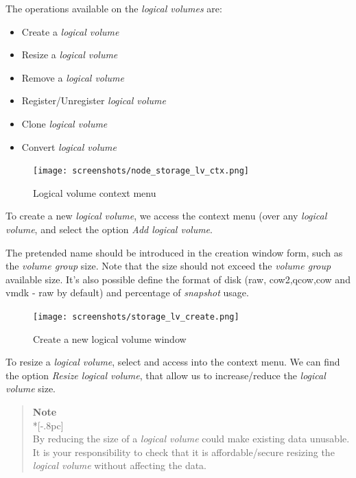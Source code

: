 The operations available on the \emph{logical volumes} are:
\begin{itemize}
	\item Create a \emph{logical volume}
	\item Resize a \emph{logical volume}
	\item Remove a \emph{logical volume}
	\item Register/Unregister \emph{logical volume}
    \item Clone \emph{logical volume}
    \item Convert \emph{logical volume}
\end{itemize}

\begin{figure}[H]
        \begin{center}
        \texttt{[image: screenshots/node\_storage\_lv\_ctx.png]}
        \caption{Logical volume context menu}
        \label{fig:storage_lv_ctx}
        \end{center}
\end{figure}

To create a new \emph{logical volume}, we access the context menu (over any \emph{logical volume}, and select the option \emph{Add logical volume}.

The pretended name should be introduced in the creation window form, such as the \emph{volume group} size. Note that the size should not exceed the \emph{volume group} available size.
It's also possible define the format of disk (raw, cow2,qcow,cow and vmdk - raw by default) and percentage of \emph{snapshot} usage.

\begin{figure}[H]
        \begin{center}
        \texttt{[image: screenshots/storage\_lv\_create.png]}
        \caption{Create a new logical volume window}
        \label{fig:storage_lv_create}
        \end{center}
\end{figure}

To resize a \emph{logical volume}, select and access into the context menu. We can find the option \emph{Resize logical volume}, that allow us to increase/reduce the \emph{logical volume} size.

\begin{quote}
	{\large \bf Note} \\*[-.8pc]
	\underline{\hspace{6in}} \\
    By reducing the size of a \emph{logical volume} could make existing data unusable. It is your responsibility to check that it is affordable/secure resizing the \emph{logical volume} without affecting the data.
\end{quote}

